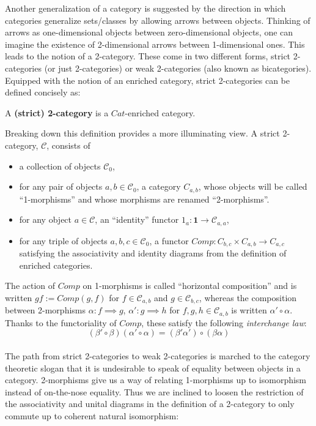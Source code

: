 Another generalization of a category is suggested by the direction in which categories generalize sets/classes by allowing arrows between objects. Thinking of arrows as one-dimensional objects between zero-dimensional objects, one can imagine the existence of 2-dimensional arrows between 1-dimensional ones. This leads to the notion of a 2-category. These come in two different forms, strict 2-categories (or just 2-categories) or weak 2-categories (also known as bicategories). Equipped with the notion of an enriched category, strict 2-categories can be defined concisely as:
\begin{defn}
  A \textbf{(strict) 2-category} is a $Cat$-enriched category.
\end{defn}
Breaking down this definition provides a more illuminating view. A strict 2-category, $\mathcal{C}$, consists of
\begin{itemize}
\item a collection of objects $\mathcal{C}_0$,
\item for any pair of objects $a, b \in \mathcal{C}_0$, a category $C_{a, b}$, whose objects will be called ``1-morphisms'' and whose morphisms are renamed ``2-morphisms''.
\item for any object $a \in \mathcal{C}$, an ``identity'' functor $1_a : \mathbf{1} \to \mathcal{C}_{a, a}$, 
\item for any triple of objects $a, b, c \in \mathcal{C}_0$, a functor $Comp : C_{b, c} \times C_{a, b} \to C_{a, c}$
  satisfying the associativity and identity diagrams from the definition of enriched categories.
\end{itemize}
The action of $Comp$ on 1-morphisms is called ``horizontal composition'' and is written $gf := Comp(g, f)$ for $f \in \mathcal{C}_{a, b}$ and $g \in \mathcal{C}_{b, c}$, whereas the composition between 2-morphisms $\alpha : f \implies g$, $\alpha' : g \implies h$ for $f, g, h \in \mathcal{C}_{a, b}$ is written $\alpha' \circ \alpha$.
Thanks to the functoriality of $Comp$, these satisfy the following \textit{interchange law}:
\[
  (\beta' \circ \beta)(\alpha'\circ \alpha)=(\beta'\alpha')\circ(\beta\alpha)
\]\\
The path from strict 2-categories to weak 2-categories is marched to the category theoretic slogan that it is undesirable to speak of equality between objects in a category. 2-morphisms give us a way of relating 1-morphisms up to isomorphism instead of on-the-nose equality. Thus we are inclined to loosen the restriction of the associativity and unital diagrams in the definition of a 2-category to only commute up to coherent natural isomorphism:
